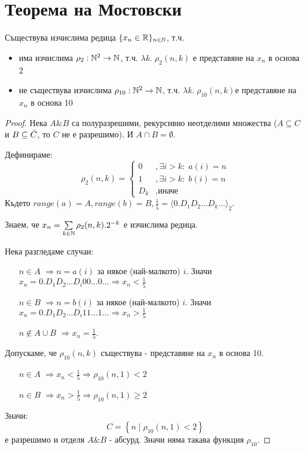 \section{Теорема на Мостовски}
\begin{theorem}
    Съществува изчислима редица $\{x_n \in {\mathbb{R}}\}_{n \in {\mathbb{N}}}$, т.ч.
    \begin{itemize}
        \item има изчислима $\rho_2: {\mathbb{N}}^2 \to {\mathbb{N}}$, т.ч. $\lambda k.\; \rho_2(n,k)$ е представяне на $x_n$ в основа 2
        \item не съществува изчислима $\rho_{10}: {\mathbb{N}}^2 \to {\mathbb{N}}$, т.ч. $\lambda k.\; \rho_{10}(n,k)$е представяне на $x_n$ в основа 10
    \end{itemize}
\end{theorem}
\begin{proof}
    Нека $A \& B$ са полуразрешими, рекурсивно неотделими множества ($A \subseteq C$ и $B \subseteq \Bar{C}$, то $C$ не е разрешимо). И $A \cap B = \emptyset$. 
    
    Дефинираме:
    \begin{equation}
        \rho_2(n,k) = \begin{cases}
            0 &, \exists i > k:\; a(i) = n \\
            1 &, \exists i > k:\; b(i) = n \\
            D_k &, \text{иначе}
        \end{cases}
    \end{equation}
    Където $range(a) = A, range(b) = B, \frac{1}{5} = \langle0.D_1 D_2 \dots D_k \dots \rangle_2$.

    Знаем, че $x_n = \sum\limits_{k\in{\mathbb{N}}} \rho_2(n,k).2^{-k}$ е изчислима редица.

    Нека разгледаме случаи:
    \begin{itemize}
        \item[$n \in A$] $\Rightarrow n = a(i)$ за някое (най-малкото) $i$. Значи $x_n = 0.D_1 D_2 \dots D_i 00 \dots 0 \dots \Rightarrow x_n < \frac{1}{5}$
        \item[$n \in B$] $\Rightarrow n = b(i)$ за някое (най-малкото) $i$. Значи $x_n = 0.D_1 D_2 \dots D_i 11 \dots 1 \dots \Rightarrow x_n > \frac{1}{5}$
        \item[$n \notin A\cup B$] $\Rightarrow x_n = \frac{1}{5}$.
    \end{itemize}

    Допускаме, че $\rho_{10}(n, k)$ съществува - представяне на $x_n$ в основа 10.
    \begin{itemize}
        \item[$n \in A$] $\Rightarrow x_n < \frac{1}{5} \Rightarrow \rho_{10}(n,1) < 2$
        \item[$n \in B$] $\Rightarrow x_n > \frac{1}{5} \Rightarrow \rho_{10}(n,1) \geq 2$
    \end{itemize}
    Значи:
    \begin{equation}
        C = \left\{n \mid \rho_{10}(n,1) < 2 \right\}    
    \end{equation}
    е разрешимо и отделя $A \& B$ - абсурд. Значи няма такава функция $\rho_{10}$.
\end{proof}